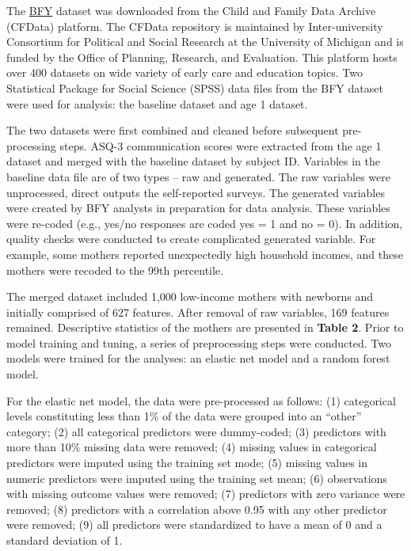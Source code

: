 \documentclass[sn-basic,pdflatex]{sn-jnl}
\begin{document}
The
\href{https://www.childandfamilydataarchive.org/cfda/archives/cfda/studies/37871/summary}{BFY}
dataset was downloaded from the Child and Family Data Archive (CFData)
platform. The CFData repository is maintained by Inter-university
Consortium for Political and Social Research at the University of
Michigan and is funded by the Office of Planning, Research, and
Evaluation. This platform hosts over 400 datasets on wide variety of
early care and education topics. Two Statistical Package for Social
Science (SPSS) data files from the BFY dataset were used for analysis:
the baseline dataset and age 1 dataset.

The two datasets were first combined and cleaned before subsequent
pre-processing steps. ASQ-3 communication scores were extracted from the
age 1 dataset and merged with the baseline dataset by subject ID.
Variables in the baseline data file are of two types -- raw and
generated. The raw variables were unprocessed, direct outputs the
self-reported surveys. The generated variables were created by BFY
analysts in preparation for data analysis. These variables were re-coded
(e.g., yes/no responses are coded yes = 1 and no = 0). In addition,
quality checks were conducted to create complicated generated variable.
For example, some mothers reported unexpectedly high household incomes,
and these mothers were recoded to the 99th percentile.

The merged dataset included 1,000 low-income mothers with newborns and
initially comprised of 627 features. After removal of raw variables, 169
features remained. Descriptive statistics of the mothers are presented
in \textbf{Table 2}. Prior to model training and tuning, a series of
preprocessing steps were conducted. Two models were trained for the
analyses: an elastic net model and a random forest model.

For the elastic net model, the data were pre-processed as follows: (1)
categorical levels constituting less than 1\% of the data were grouped
into an ``other'' category; (2) all categorical predictors were
dummy-coded; (3) predictors with more than 10\% missing data were
removed; (4) missing values in categorical predictors were imputed using
the training set mode; (5) missing values in numeric predictors were
imputed using the training set mean; (6) observations with missing
outcome values were removed; (7) predictors with zero variance were
removed; (8) predictors with a correlation above 0.95 with any other
predictor were removed; (9) all predictors were standardized to have a
mean of 0 and a standard deviation of 1.
\end{document}
